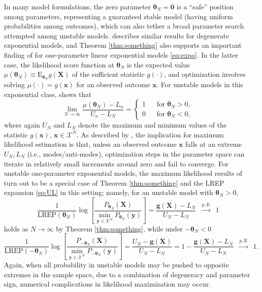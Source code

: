 \documentclass[numbib]{imamat}
\theoremstyle{theorem}
\theoremstyle{lemma}
\theoremstyle{example}
\theoremstyle{corollary}
\theoremstyle{definition}
\theoremstyle{remark}
\theoremstyle{approximation}
\theoremstyle{scheme}
\newcommand{\REP}{\mathrm{LREP}}
\begin{document}
In many model formulations, the zero parameter \(\boldsymbol \theta_N=\boldsymbol 0\) is a ``safe'' position among parameters, representing a guaranteed stable model (having uniform probabilities among outcomes), which can also tether a broad parameter search attempted among unstable models. \citet{handcock2003assessing} describes similar results for degenerate exponential models, and Theorem \ref{thm:something} also supports an important finding of \citet[Corollary 1]{schweinberger2011instability} for one-parameter linear exponential models \eqref{eq:expo}. In the latter case, the likelihood score function at \(\boldsymbol \theta_N\) is the expected value \(\mu(\boldsymbol \theta_N)\equiv \mathrm{E}_{\boldsymbol \theta_N} g(\boldsymbol X)\) of the sufficient statistic \(g(\cdot)\), and optimization involves solving \(\mu(\cdot)=g(\boldsymbol x)\) for an observed outcome \(\boldsymbol x\). For unstable models in this exponential class, \citet[Corollary 1]{schweinberger2011instability} shows
that
\[
\lim_{N\to \infty}\frac{\mu(\boldsymbol \theta_N) -L_n}{U_n-L_N}= \left\{ \begin{array}{lcl}
1 && \text{for } \boldsymbol \theta_N>0,\\
0 && \text{for } \boldsymbol \theta_N<0, \end{array}\right.
\]
where again \(U_N\) and \(L_N\) denote the maximum and minimum values of the statistic \(g(\boldsymbol x)\), \(\boldsymbol x\in\mathcal{X}^N\). As described by \citet{schweinberger2011instability}, the implication for maximum likelihood estimation is that, unless an observed outcome \(\boldsymbol x\) falls at an extreme \(U_N, L_N\) (i.e., modes/anti-modes), optimization steps in the parameter space can iterate in relatively small increments around zero and fail to converge. For unstable one-parameter exponential models, the maximum likelihood results of \citet{schweinberger2011instability} turn out to be a special case of Theorem \ref{thm:something} and the LREP expansion \eqref{eq:UL} in this setting; namely, for an unstable model with \(\boldsymbol \theta_N>0\),
\[
\frac{1}{\REP(\boldsymbol \theta_N)} \log\left[ \frac{P_{\boldsymbol \theta_N }(\boldsymbol X) }{\displaystyle{\min_{\boldsymbol y\in\mathcal{X}^N}} P_{\boldsymbol \theta_N }(\boldsymbol y)}\right] = \frac{\boldsymbol g(\boldsymbol X) - L_N}{U_N-L_N}\;\;\stackrel{p, \mathrm{E}}{\longrightarrow}\;\; 1
\]
holds as \(N\to \infty\) by Theorem \ref{thm:something}, while under \(-\boldsymbol \theta_N<0\)
\[
\frac{1}{\REP(-\boldsymbol \theta_N)} \log\left[ \frac{P_{-\boldsymbol \theta_N }(\boldsymbol X) }{\displaystyle{\min_{\boldsymbol y\in\mathcal{X}^N}} P_{-\boldsymbol \theta_N }(\boldsymbol y)}\right] = \frac{U_N -\boldsymbol g(\boldsymbol X)}{U_N-L_N} = 1 - \frac{\boldsymbol g(\boldsymbol X) - L_N}{U_N-L_N} \;\;\stackrel{p, \mathrm{E}}{\longrightarrow}\;\; 1.
\]
Again, when all probability in unstable models may be pushed to opposite extremes in the sample space, due to a combination of degeneracy and parameter sign, numerical complications in likelihood maximization may occur.
\end{document}
